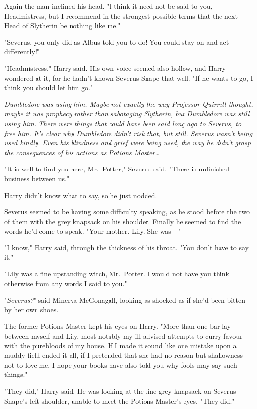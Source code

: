 Again the man inclined his head. "I think it need not be said to you,
Headmistress, but I recommend in the strongest possible terms that the next
Head of Slytherin be nothing like me."

"Severus, you only did as Albus told you to do! You could stay on and act
differently!"

"Headmistress," Harry said. His own voice seemed also hollow, and Harry
wondered at it, for he hadn't known Severus Snape that well. "If he wants to
go, I think you should let him go."

\emph{Dumbledore was using him. Maybe not exactly the way Professor Quirrell
thought, maybe it was prophecy rather than sabotaging Slytherin, but Dumbledore
was still using him. There were things that could have been said long ago to
Severus, to free him. It's clear why Dumbledore didn't risk that, but still,
Severus wasn't being used kindly. Even his blindness and grief were being used,
the way he didn't grasp the consequences of his actions as Potions
Master{\ldots}}

"It is well to find you here, Mr.~Potter," Severus said. "There is unfinished
business between us."

Harry didn't know what to say, so he just nodded.

Severus seemed to be having some difficulty speaking, as he stood before the
two of them with the grey knapsack on his shoulder. Finally he seemed to find
the words he'd come to speak. "Your mother. Lily. She was---"

"I know," Harry said, through the thickness of his throat. "You don't have to
say it."

"Lily was a fine upstanding witch, Mr.~Potter. I would not have you think
otherwise from any words I said to you."

"\emph{Severus?}" said Minerva McGonagall, looking as shocked as if she'd been
bitten by her own shoes.

The former Potions Master kept his eyes on Harry. "More than one bar lay
between myself and Lily, most notably my ill-advised attempts to curry favour
with the purebloods of my house. If I made it sound like one mistake upon a
muddy field ended it all, if I pretended that she had no reason but shallowness
not to love me, I hope your books have also told you why fools may say such
things."

"They did," Harry said. He was looking at the fine grey knapsack on Severus
Snape's left shoulder, unable to meet the Potions Master's eyes. "They did."

